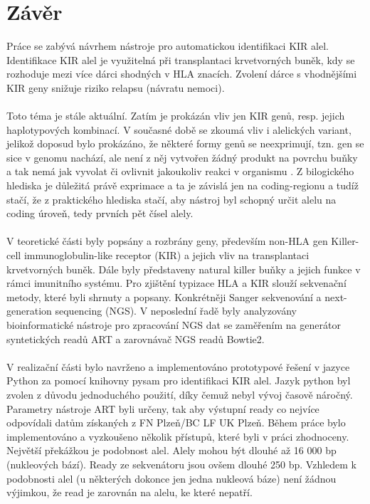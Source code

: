 \documentclass[czech,DP]{thesiskiv}
\numberwithin{equation}{section}
\begin{document}
\chapter{Závěr}
Práce se zabývá návrhem nástroje pro automatickou identifikaci KIR alel. Identifikace KIR alel je využitelná při transplantaci krvetvorných buněk, kdy se rozhoduje mezi více dárci shodných v HLA znacích. Zvolení dárce s vhodnějšími KIR geny snižuje riziko relapsu (návratu nemoci).
\\
\\
Toto téma je stále aktuální. Zatím je prokázán vliv jen KIR genů, resp. jejich haplotypových kombinací. V současné době se zkoumá vliv i alelických variant, jelikož doposud bylo prokázáno, že některé formy genů se neexprimují, tzn. gen se sice v genomu nachází, ale není z něj vytvořen žádný produkt na povrchu buňky a tak nemá jak vyvolat či ovlivnit jakoukoliv reakci v organismu \cite{exprimace_zaver}. Z bilogického hlediska je důležitá právě exprimace a ta je závislá jen na coding-regionu a tudíž stačí, že z praktického hlediska stačí, aby nástroj byl schopný určit alelu na coding úroveň, tedy prvních pět čísel alely. 
\\
\\
V teoretické části byly popsány a rozbrány geny, především non-HLA gen Killer-cell immunoglobulin-like receptor (KIR) a jejich vliv na transplantaci krvetvorných buněk. Dále byly představeny natural killer buňky a jejich funkce v rámci imunitního systému. Pro zjištění typizace HLA a KIR slouží sekvenační metody, které byli shrnuty a popsany. Konkrétněji Sanger sekvenování a next-generation sequencing (NGS). V neposlední řadě byly analyzovány bioinformatické nástroje pro zpracování NGS dat se zaměřením na generátor syntetických readů ART a zarovnávač NGS readů Bowtie2.
\\
\\
V realizační části bylo navrženo a implementováno prototypové řešení v jazyce Python za pomocí knihovny pysam pro identifikaci KIR alel. Jazyk python byl zvolen z důvodu jednoduchého použití, díky čemuž nebyl vývoj časově náročný. Parametry nástroje ART byli určeny, tak aby výstupní ready co nejvíce odpovídali datům získaných z FN Plzeň/BC LF UK Plzeň. Během práce bylo implementováno a vyzkoušeno několik přístupů, které byli v práci zhodnoceny. Největší překážkou je podobnost alel. Alely mohou být dlouhé až 16 000 bp (nukleových bází). Ready ze sekvenátoru jsou ovšem dlouhé 250 bp. Vzhledem k podobnosti alel (u některých dokonce jen jedna nukleová báze) není žádnou výjimkou, že read je zarovnán na alelu, ke které nepatří. 
\end{document}
